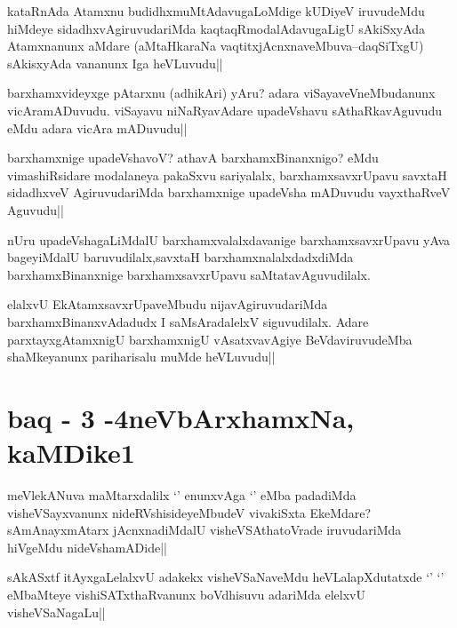 \begin{artha}
kataRnAda Atamxnu budidhxmuMtAdavugaLoMdige kUDiyeV iruvudeMdu hiMdeye sidadhxvAgiruvudariMda kaqtaqRmodalAdavugaLigU sAkiSxyAda Atamxnanunx aMdare (aMtaHkaraNa vaqtitxjAcnxnaveMbuva--daqSiTxgU) sAkisxyAda vananunx Iga heVLuvudu||
\end{artha}

\begin{artha}
barxhamxvideyxge pAtarxnu (adhikAri) yAru? adara viSayaveVneMbudanunx vicAramADuvudu. viSayavu niNaRyavAdare upadeVshavu sAthaRkavAguvudu eMdu adara vicAra mADuvudu||
\end{artha}


\begin{artha}
barxhamxnige upadeVshavoV? athavA barxhamxBinanxnigo? eMdu vimashiRsidare modalaneya pakaSxvu sariyalalx, barxhamxsavxrUpavu savxtaH sidadhxveV AgiruvudariMda barxhamxnige upadeVsha mADuvudu vayxthaRveV Aguvudu||
\end{artha}


\begin{artha}
nUru upadeVshagaLiMdalU barxhamxvalalxdavanige barxhamxsavxrUpavu yAva bageyiMdalU baruvudilalx,savxtaH barxhamxnalalxdadxdiMda barxhamxBinanxnige barxhamxsavxrUpavu saMtatavAguvudilalx.
\end{artha}

\begin{artha}
elalxvU EkAtamxsavxrUpaveMbudu nijavAgiruvudariMda barxhamxBinanxvAdadudx I saMsAradalelxV siguvudilalx. Adare parxtayxgAtamxnigU barxhamxnigU vAsatxvavAgiye BeVdaviruvudeMba shaMkeyanunx pariharisalu muMde heVLuvudu||
\end{artha}

\section*{baq - 3 -4neVbArxhamxNa, kaMDike1}


\begin{artha}
meVlekANuva maMtarxdalilx `\stext' enunxvAga `\stext' eMba padadiMda visheVSayxvanunx nideRVshisideyeMbudeV vivakiSxta EkeMdare? sAmAnayxmAtarx jAcnxnadiMdalU visheVSAthatoVrade iruvudariMda hiVgeMdu nideVshamADide||
\end{artha}

\begin{artha}
sAkASxtf itAyxgaLelalxvU adakekx visheVSaNaveMdu heVLalapXdutatxde `\stext' `\stext' eMbaMteye vishiSATxthaRvanunx boVdhisuvu adariMda elelxvU visheVSaNagaLu||
\end{artha}

